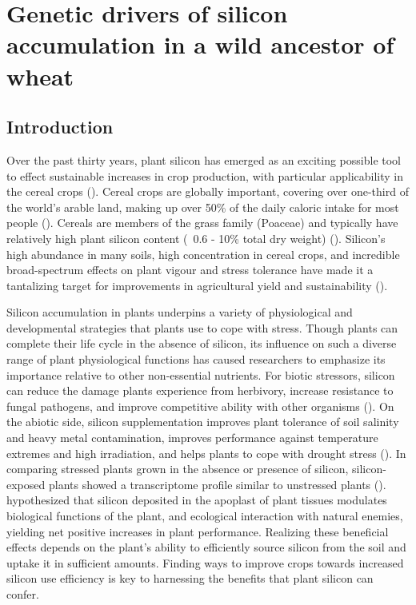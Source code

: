 \documentclass[12pt, letterpaper]{report}
\begin{document}
\clearpage



\chapter{Genetic drivers of silicon accumulation in a wild ancestor of wheat}

\section{Introduction}

Over the past thirty years, plant silicon has emerged as an exciting possible tool to effect sustainable increases in crop production, with particular applicability in the cereal crops (\cite{reynolds_silicon_2016,christian_breeding_2022}). Cereal crops are globally important, covering over one-third of the world’s arable land, making up over 50\% of the daily caloric intake for most people (\cite{rudel_agricultural_2009,awika_major_2011,faostat}). Cereals are members of the grass family (Poaceae) and typically have relatively high plant silicon content (~0.6 - 10\% total dry weight) (\cite{reynolds_silicon_2016}). Silicon's high abundance in many soils, high concentration in cereal crops, and incredible broad-spectrum effects on plant vigour and stress tolerance have made it a tantalizing target for improvements in agricultural yield and sustainability (\cite{christian_breeding_2022}).

Silicon accumulation in plants underpins a variety of physiological and developmental strategies that plants use to cope with stress. Though plants can complete their life cycle in the absence of silicon, its influence on such a diverse range of plant physiological functions has caused researchers to emphasize its importance relative to other non-essential nutrients. For biotic stressors, silicon can reduce the damage plants experience from herbivory, increase resistance to fungal pathogens, and improve competitive ability with other organisms (\cite{fauteux_silicon_2005,katz_silicon_2019}). On the abiotic side, silicon supplementation improves plant tolerance of soil salinity and heavy metal contamination, improves performance against temperature extremes and high irradiation, and helps plants to cope with drought stress (\cite{cooke_consistent_2016}). In comparing stressed plants grown in the absence or presence of silicon, silicon-exposed plants showed a transcriptome profile similar to unstressed plants (\cite{coskun_controversies_2019}). \textcite{coskun_controversies_2019} hypothesized that silicon deposited in the apoplast of plant tissues modulates biological functions of the plant, and ecological interaction with natural enemies, yielding net positive increases in plant performance. Realizing these beneficial effects depends on the plant’s ability to efficiently source silicon from the soil and uptake it in sufficient amounts. Finding ways to improve crops towards increased silicon use efficiency is key to harnessing the benefits that plant silicon can confer.
\end{document}
